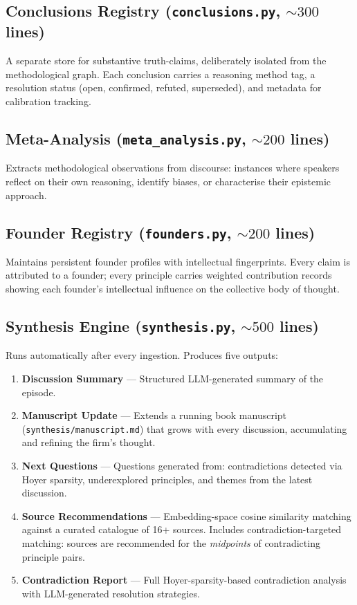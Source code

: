 \documentclass[11pt,letterpaper]{article}
\begin{document}
\subsection{Conclusions Registry (\texttt{conclusions.py}, ${\sim}300$ lines)}

A separate store for substantive truth-claims, deliberately isolated from the methodological graph. Each conclusion carries a reasoning method tag, a resolution status (open, confirmed, refuted, superseded), and metadata for calibration tracking.

\subsection{Meta-Analysis (\texttt{meta\_analysis.py}, ${\sim}200$ lines)}

Extracts methodological observations from discourse: instances where speakers reflect on their own reasoning, identify biases, or characterise their epistemic approach.

\subsection{Founder Registry (\texttt{founders.py}, ${\sim}200$ lines)}

Maintains persistent founder profiles with intellectual fingerprints. Every claim is attributed to a founder; every principle carries weighted contribution records showing each founder's intellectual influence on the collective body of thought.

\subsection{Synthesis Engine (\texttt{synthesis.py}, ${\sim}500$ lines)}
\label{sec:synthesis}

Runs automatically after every ingestion. Produces five outputs:

\begin{enumerate}
\item \textbf{Discussion Summary} --- Structured LLM-generated summary of the episode.
\item \textbf{Manuscript Update} --- Extends a running book manuscript (\texttt{synthesis/manuscript.md}) that grows with every discussion, accumulating and refining the firm's thought.
\item \textbf{Next Questions} --- Questions generated from: contradictions detected via Hoyer sparsity, underexplored principles, and themes from the latest discussion.
\item \textbf{Source Recommendations} --- Embedding-space cosine similarity matching against a curated catalogue of 16+ sources. Includes contradiction-targeted matching: sources are recommended for the \emph{midpoints} of contradicting principle pairs.
\item \textbf{Contradiction Report} --- Full Hoyer-sparsity-based contradiction analysis with LLM-generated resolution strategies.
\end{enumerate}
\end{document}
